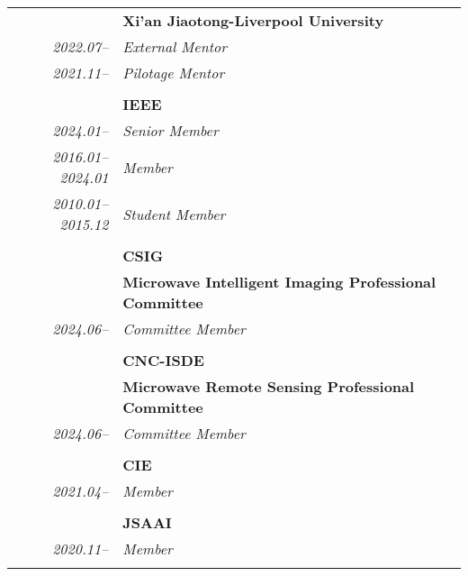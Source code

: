 \documentclass[paper=a4,fontsize=11pt]{scrartcl}
\begin{document}
\begin{longtable}{r|p{11cm}}
	
	~ & \textbf{Xi'an Jiaotong-Liverpool University}\\
	\emph{2022.07--} & \emph{External Mentor}\\
	\emph{2021.11--} & \emph{Pilotage Mentor}\\
	\multicolumn{2}{c}{} \\
	
	
	
	~ & \textbf{IEEE}\\
	\emph{2024.01--} & \emph{Senior Member}\\
	\emph{2016.01--2024.01} & \emph{Member}\\
	\emph{2010.01--2015.12} & \emph{Student Member}\\
	\multicolumn{2}{c}{} \\
	
		~ & \textbf{CSIG}\\
	~ & \textbf{Microwave Intelligent Imaging Professional Committee} \\
	\emph{2024.06--} & \emph{Committee Member}\\
	\multicolumn{2}{c}{} \\
	
	~ & \textbf{CNC-ISDE}\\
	~ & \textbf{Microwave Remote Sensing Professional Committee}\\
	\emph{2024.06--} & \emph{Committee Member}\\
	\multicolumn{2}{c}{} \\
	
	~ & \textbf{CIE} \\
	\emph{2021.04--} & \emph{Member}\\
	\multicolumn{2}{c}{} \\
	
	
	~ & \textbf{JSAAI} \\
	\emph{2020.11--} & \emph{Member}\\
	\multicolumn{2}{c}{}
	
	
\end{longtable}
\end{document}
